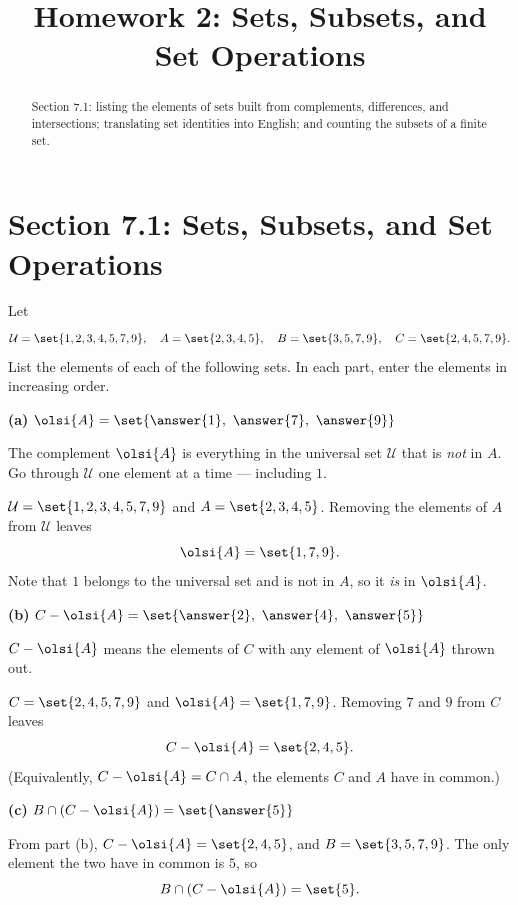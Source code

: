 \documentclass[12pt]{ximera}
\title{Homework 2: Sets, Subsets, and Set Operations}
\begin{document}
\begin{abstract}
Section 7.1: listing the elements of sets built from complements, differences, and
intersections; translating set identities into English; and counting the subsets of
a finite set.
\end{abstract}
\maketitle

\section*{Section 7.1: Sets, Subsets, and Set Operations}

\begin{problem}
Let
\[
\mathcal{U}=\set{1,2,3,4,5,7,9}, \quad
A=\set{2,3,4,5}, \quad
B=\set{3,5,7,9}, \quad
C=\set{2,4,5,7,9}.
\]
List the elements of each of the following sets. In each part, enter the elements in
increasing order.

\begin{prompt}
\textbf{(a)} $\olsi{A} = \set{\answer{1},\ \answer{7},\ \answer{9}}$

\begin{hint}
The complement $\olsi{A}$ is everything in the universal set $\mathcal{U}$ that is
\emph{not} in $A$. Go through $\mathcal{U}$ one element at a time --- including
$1$.
\end{hint}

\begin{solution}
$\mathcal{U}=\set{1,2,3,4,5,7,9}$ and $A=\set{2,3,4,5}$. Removing the elements of
$A$ from $\mathcal{U}$ leaves
\[ \olsi{A} = \set{1,7,9}. \]
Note that $1$ belongs to the universal set and is not in $A$, so it \emph{is} in
$\olsi{A}$.
\end{solution}
\end{prompt}

\begin{prompt}
\textbf{(b)} $C - \olsi{A} = \set{\answer{2},\ \answer{4},\ \answer{5}}$

\begin{hint}
$C-\olsi{A}$ means the elements of $C$ with any element of $\olsi{A}$ thrown out.
\end{hint}

\begin{solution}
$C=\set{2,4,5,7,9}$ and $\olsi{A}=\set{1,7,9}$. Removing $7$ and $9$ from $C$ leaves
\[ C-\olsi{A} = \set{2,4,5}. \]
(Equivalently, $C-\olsi{A}=C\cap A$, the elements $C$ and $A$ have in common.)
\end{solution}
\end{prompt}

\begin{prompt}
\textbf{(c)} $B\cap\left(C - \olsi{A}\right) = \set{\answer{5}}$

\begin{solution}
From part (b), $C-\olsi{A}=\set{2,4,5}$, and $B=\set{3,5,7,9}$. The only element the
two have in common is $5$, so
\[ B\cap\left(C-\olsi{A}\right)=\set{5}. \]
\end{solution}
\end{prompt}
\end{problem}
\end{document}
